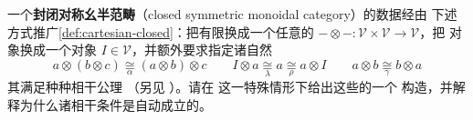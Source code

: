 \begin{exercise}\label{ex:closed-symmetric-monoidal}
一个\textbf{封闭对称幺半范畴}（closed symmetric monoidal category）的数据经由
下述方式推广\cref{def:cartesian-closed}：把有限\trProduct{}换成一个任意的%
\trBifunctor{} $-\otimes-\colon\mathcal{V}\times\mathcal{V}\to\mathcal{V}$，把%
\trTerminal{}对象换成一个对象 $I\in\mathcal{V}$，并额外要求指定诸自然%
\trIsomorphism
\[
a\otimes(b\otimes c)\mathrel{\underset{\alpha}{\cong}}(a\otimes b)\otimes c
\qquad
I\otimes a\mathrel{\underset{\lambda}{\cong}}a
\mathrel{\underset{\rho}{\cong}}a\otimes I
\qquad
a\otimes b\mathrel{\underset{\gamma}{\cong}}b\otimes a
\]
其满足种种相干公理 \cite{bib41,bib66}（另见 \cite{bib69}）。请在%
\trCartesianClosed{}\trCategory{}这一特殊情形下给出这些\trIsomorphism{}的一个%
\trCanonical{}构造，并解释为什么诸相干条件是自动成立的。
\end{exercise}

